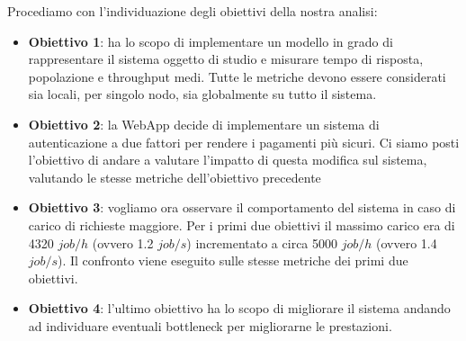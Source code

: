 Procediamo con l'individuazione degli obiettivi della nostra analisi:
\begin{itemize}
    \item \textbf{Obiettivo 1}: ha lo scopo di implementare un modello in grado di rappresentare il sistema oggetto di studio e misurare tempo di risposta, popolazione e throughput medi. Tutte le metriche devono essere considerati sia locali, per singolo nodo, sia globalmente su tutto il sistema.
    \item \textbf{Obiettivo 2}: la WebApp decide di implementare un sistema di autenticazione a due fattori per rendere i pagamenti più sicuri. Ci siamo posti l'obiettivo di andare a valutare l'impatto di questa modifica sul sistema, valutando le stesse metriche dell'obiettivo precedente
    \item \textbf{Obiettivo 3}: vogliamo ora osservare il comportamento del sistema in caso di carico di richieste maggiore. Per i primi due obiettivi il massimo carico era di 4320 $job/h$ (ovvero 1.2 $job/s$) incrementato a circa 5000 $job/h$ (ovvero 1.4 $job/s$). Il confronto viene eseguito sulle stesse metriche dei primi due obiettivi.
    \item \textbf{Obiettivo 4}: l'ultimo obiettivo ha lo scopo di migliorare il sistema andando ad individuare eventuali bottleneck per migliorarne le prestazioni.
\end{itemize}